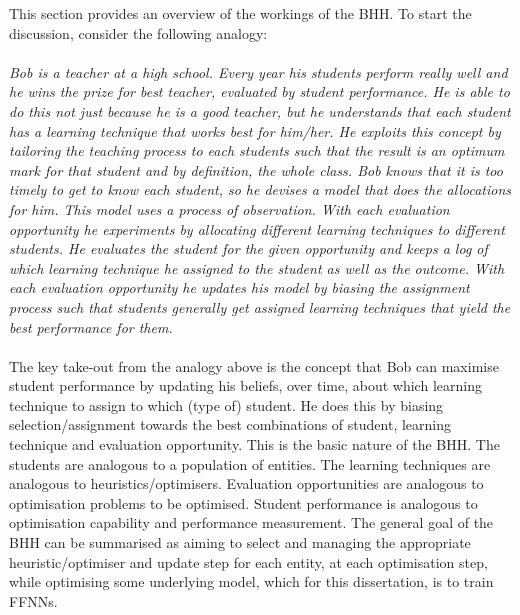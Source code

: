 This section provides an overview of the workings of the \Ac{BHH}. To start the discussion, consider the following analogy:\\
\\
\textit{
    Bob is a teacher at a high school. Every year his students perform really well and he wins the prize for best teacher, evaluated by student performance. He is able to do this not just because he is a good teacher, but he understands that each student has a learning technique that works best for him/her. He exploits this concept by tailoring the teaching process to each students such that the result is an optimum mark for that student and by definition, the whole class. Bob knows that it is too timely to get to know each student, so he devises a model that does the allocations for him. This model uses a process of observation. With each evaluation opportunity he experiments by allocating different learning techniques to different students. He evaluates the student for the given opportunity and keeps a log of which learning technique he assigned to the student as well as the outcome. With each evaluation opportunity he updates his model by biasing the assignment process such that students generally get assigned learning techniques that yield the best performance for them.
}\\
\\
The key take-out from the analogy above is the concept that Bob can maximise student performance by updating his beliefs, over time, about which learning technique to assign to which (type of) student. He does this by biasing selection/assignment towards the best combinations of student, learning technique
and evaluation opportunity. This is the basic nature of the \Ac{BHH}. The students are analogous to a population of entities. The learning techniques are analogous to heuristics/optimisers. Evaluation opportunities are analogous to optimisation problems to be optimised. Student performance is analogous to optimisation capability and performance measurement. The general goal of the \ac{BHH} can be summarised as aiming to select and managing the appropriate  heuristic/optimiser and update step for each entity, at each optimisation step, while optimising some underlying model, which for this dissertation, is to train \acp{FFNN}. 

